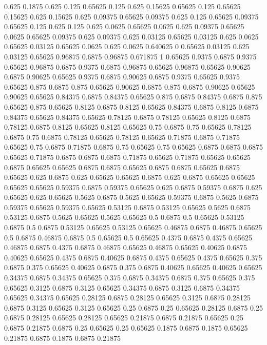 0.625 0.1875
0.625 0.125
0.65625 0.125
0.625 0.15625
0.65625 0.125
0.65625 0.15625
0.625 0.15625
0.625 0.09375
0.65625 0.09375
0.625 0.125
0.65625 0.09375
0.65625 0.125
0.625 0.125
0.625 0.0625
0.65625 0.0625
0.625 0.09375
0.65625 0.0625
0.65625 0.09375
0.625 0.09375
0.625 0.03125
0.65625 0.03125
0.625 0.0625
0.65625 0.03125
0.65625 0.0625
0.625 0.0625
0.640625 0
0.65625 0.03125
0.625 0.03125
0.65625 0.96875
0.6875 0.96875
0.671875 1
0.65625 0.9375
0.6875 0.9375
0.65625 0.96875
0.6875 0.9375
0.6875 0.96875
0.65625 0.96875
0.65625 0.90625
0.6875 0.90625
0.65625 0.9375
0.6875 0.90625
0.6875 0.9375
0.65625 0.9375
0.65625 0.875
0.6875 0.875
0.65625 0.90625
0.6875 0.875
0.6875 0.90625
0.65625 0.90625
0.65625 0.84375
0.6875 0.84375
0.65625 0.875
0.6875 0.84375
0.6875 0.875
0.65625 0.875
0.65625 0.8125
0.6875 0.8125
0.65625 0.84375
0.6875 0.8125
0.6875 0.84375
0.65625 0.84375
0.65625 0.78125
0.6875 0.78125
0.65625 0.8125
0.6875 0.78125
0.6875 0.8125
0.65625 0.8125
0.65625 0.75
0.6875 0.75
0.65625 0.78125
0.6875 0.75
0.6875 0.78125
0.65625 0.78125
0.65625 0.71875
0.6875 0.71875
0.65625 0.75
0.6875 0.71875
0.6875 0.75
0.65625 0.75
0.65625 0.6875
0.6875 0.6875
0.65625 0.71875
0.6875 0.6875
0.6875 0.71875
0.65625 0.71875
0.65625 0.65625
0.6875 0.65625
0.65625 0.6875
0.6875 0.65625
0.6875 0.6875
0.65625 0.6875
0.65625 0.625
0.6875 0.625
0.65625 0.65625
0.6875 0.625
0.6875 0.65625
0.65625 0.65625
0.65625 0.59375
0.6875 0.59375
0.65625 0.625
0.6875 0.59375
0.6875 0.625
0.65625 0.625
0.65625 0.5625
0.6875 0.5625
0.65625 0.59375
0.6875 0.5625
0.6875 0.59375
0.65625 0.59375
0.65625 0.53125
0.6875 0.53125
0.65625 0.5625
0.6875 0.53125
0.6875 0.5625
0.65625 0.5625
0.65625 0.5
0.6875 0.5
0.65625 0.53125
0.6875 0.5
0.6875 0.53125
0.65625 0.53125
0.65625 0.46875
0.6875 0.46875
0.65625 0.5
0.6875 0.46875
0.6875 0.5
0.65625 0.5
0.65625 0.4375
0.6875 0.4375
0.65625 0.46875
0.6875 0.4375
0.6875 0.46875
0.65625 0.46875
0.65625 0.40625
0.6875 0.40625
0.65625 0.4375
0.6875 0.40625
0.6875 0.4375
0.65625 0.4375
0.65625 0.375
0.6875 0.375
0.65625 0.40625
0.6875 0.375
0.6875 0.40625
0.65625 0.40625
0.65625 0.34375
0.6875 0.34375
0.65625 0.375
0.6875 0.34375
0.6875 0.375
0.65625 0.375
0.65625 0.3125
0.6875 0.3125
0.65625 0.34375
0.6875 0.3125
0.6875 0.34375
0.65625 0.34375
0.65625 0.28125
0.6875 0.28125
0.65625 0.3125
0.6875 0.28125
0.6875 0.3125
0.65625 0.3125
0.65625 0.25
0.6875 0.25
0.65625 0.28125
0.6875 0.25
0.6875 0.28125
0.65625 0.28125
0.65625 0.21875
0.6875 0.21875
0.65625 0.25
0.6875 0.21875
0.6875 0.25
0.65625 0.25
0.65625 0.1875
0.6875 0.1875
0.65625 0.21875
0.6875 0.1875
0.6875 0.21875
